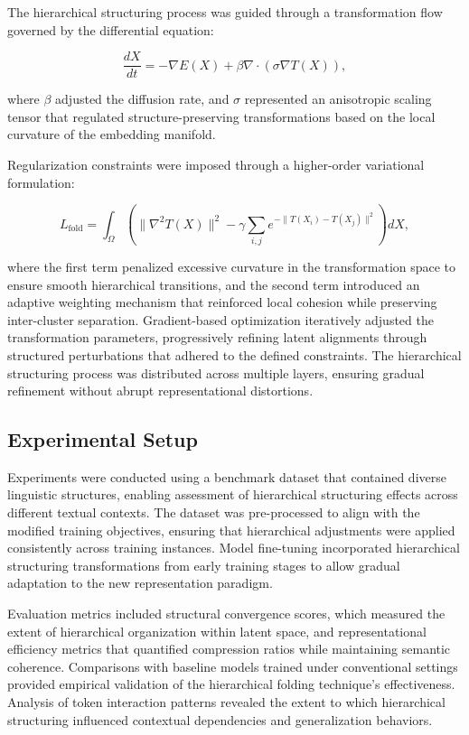 \documentclass[5p,times]{elsarticle}
\begin{document}
The hierarchical structuring process was guided through a transformation flow governed by the differential equation:

\begin{equation}
	\frac{dX}{dt} = -\nabla E(X) + \beta \nabla \cdot (\sigma \nabla T(X)),
\end{equation}

where \( \beta \) adjusted the diffusion rate, and \( \sigma \) represented an anisotropic scaling tensor that regulated structure-preserving transformations based on the local curvature of the embedding manifold.

Regularization constraints were imposed through a higher-order variational formulation:

\begin{equation}
	L_{\text{fold}} = \int_{\Omega} \left( \| \nabla^2 T(X) \|^2 - \gamma \sum_{i,j} e^{-\|T(X_i) - T(X_j)\|^2} \right) dX,
\end{equation}

where the first term penalized excessive curvature in the transformation space to ensure smooth hierarchical transitions, and the second term introduced an adaptive weighting mechanism that reinforced local cohesion while preserving inter-cluster separation. Gradient-based optimization iteratively adjusted the transformation parameters, progressively refining latent alignments through structured perturbations that adhered to the defined constraints. The hierarchical structuring process was distributed across multiple layers, ensuring gradual refinement without abrupt representational distortions.


\subsection{Experimental Setup}

Experiments were conducted using a benchmark dataset that contained diverse linguistic structures, enabling assessment of hierarchical structuring effects across different textual contexts. The dataset was pre-processed to align with the modified training objectives, ensuring that hierarchical adjustments were applied consistently across training instances. Model fine-tuning incorporated hierarchical structuring transformations from early training stages to allow gradual adaptation to the new representation paradigm.

Evaluation metrics included structural convergence scores, which measured the extent of hierarchical organization within latent space, and representational efficiency metrics that quantified compression ratios while maintaining semantic coherence. Comparisons with baseline models trained under conventional settings provided empirical validation of the hierarchical folding technique’s effectiveness. Analysis of token interaction patterns revealed the extent to which hierarchical structuring influenced contextual dependencies and generalization behaviors.
\end{document}
